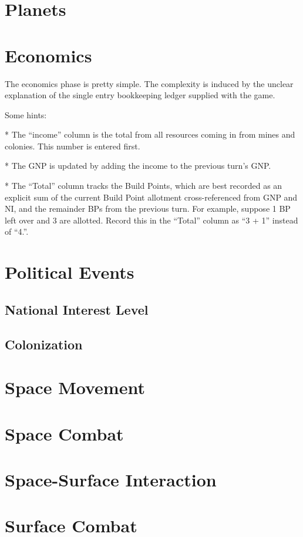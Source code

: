\documentclass[10pt]{article}
\begin{document}
\begin{multicols}{2}
\section{Planets}
\section{Economics}


The economics phase is pretty simple. The complexity is induced
by the unclear explanation of the single entry bookkeeping ledger
supplied with the game.

Some hints:

* The ``income'' column is the total from all resources coming in from mines
and colonies. This number is entered first.

* The GNP is updated by adding the income to the previous turn's GNP.

* The ``Total'' column tracks the Build Points, which are best recorded
as an explicit sum of the current Build Point allotment cross-referenced
from GNP and NI, and the remainder BPs from the previous turn. For example,
suppose 1 BP left over and 3 are allotted. Record this in the ``Total'' column
as ``3 + 1'' instead of ``4.''.

\section{Political Events}
\subsection{National Interest Level}
\subsection{Colonization}

\section{Space Movement}

\section{Space Combat}

\section{Space-Surface Interaction}

\section{Surface Combat}


\end{multicols}
\end{document}

